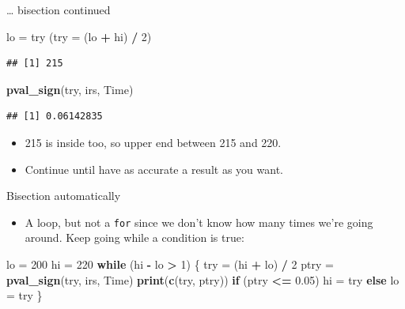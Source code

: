 \documentclass[ignorenonframetext,]{beamer}
\newenvironment{Shaded}{\begin{snugshade}}{\end{snugshade}}
\newcommand{\ControlFlowTok}[1]{\textcolor[rgb]{0.13,0.29,0.53}{\textbf{#1}}}
\newcommand{\DataTypeTok}[1]{\textcolor[rgb]{0.13,0.29,0.53}{#1}}
\newcommand{\DecValTok}[1]{\textcolor[rgb]{0.00,0.00,0.81}{#1}}
\newcommand{\FloatTok}[1]{\textcolor[rgb]{0.00,0.00,0.81}{#1}}
\newcommand{\KeywordTok}[1]{\textcolor[rgb]{0.13,0.29,0.53}{\textbf{#1}}}
\newcommand{\NormalTok}[1]{#1}
\newcommand{\OperatorTok}[1]{\textcolor[rgb]{0.81,0.36,0.00}{\textbf{#1}}}
\newcommand{\StringTok}[1]{\textcolor[rgb]{0.31,0.60,0.02}{#1}}
\providecommand{\tightlist}{%
  \setlength{\itemsep}{0pt}\setlength{\parskip}{0pt}}
\begin{document}
\begin{frame}[fragile]{\ldots{} bisection continued}
\protect\hypertarget{bisection-continued}{}

\begin{Shaded}
\begin{Highlighting}[]
\NormalTok{lo =}\StringTok{ }\NormalTok{try}
\NormalTok{(}\DataTypeTok{try =}\NormalTok{ (lo }\OperatorTok{+}\StringTok{ }\NormalTok{hi) }\OperatorTok{/}\StringTok{ }\DecValTok{2}\NormalTok{)}
\end{Highlighting}
\end{Shaded}

\begin{verbatim}
## [1] 215
\end{verbatim}

\begin{Shaded}
\begin{Highlighting}[]
\KeywordTok{pval_sign}\NormalTok{(try, irs, Time)}
\end{Highlighting}
\end{Shaded}

\begin{verbatim}
## [1] 0.06142835
\end{verbatim}

\begin{itemize}
\tightlist
\item
  215 is inside too, so upper end between 215 and 220.
\item
  Continue until have as accurate a result as you want.
\end{itemize}

\end{frame}

\begin{frame}[fragile]{Bisection automatically}
\protect\hypertarget{bisection-automatically}{}

\begin{itemize}
\tightlist
\item
  A loop, but not a \texttt{for} since we don't know how many times
  we're going around. Keep going while a condition is true:
\end{itemize}

\begin{Shaded}
\begin{Highlighting}[]
\NormalTok{lo =}\StringTok{ }\DecValTok{200}
\NormalTok{hi =}\StringTok{ }\DecValTok{220}
\ControlFlowTok{while}\NormalTok{ (hi }\OperatorTok{-}\StringTok{ }\NormalTok{lo }\OperatorTok{>}\StringTok{ }\DecValTok{1}\NormalTok{) \{}
\NormalTok{  try =}\StringTok{ }\NormalTok{(hi }\OperatorTok{+}\StringTok{ }\NormalTok{lo) }\OperatorTok{/}\StringTok{ }\DecValTok{2}
\NormalTok{  ptry =}\StringTok{ }\KeywordTok{pval_sign}\NormalTok{(try, irs, Time)}
  \KeywordTok{print}\NormalTok{(}\KeywordTok{c}\NormalTok{(try, ptry))}
  \ControlFlowTok{if}\NormalTok{ (ptry }\OperatorTok{<=}\StringTok{ }\FloatTok{0.05}\NormalTok{)}
\NormalTok{    hi =}\StringTok{ }\NormalTok{try}
  \ControlFlowTok{else}
\NormalTok{    lo =}\StringTok{ }\NormalTok{try}
\NormalTok{\}}
\end{Highlighting}
\end{Shaded}

\end{frame}
\end{document}
